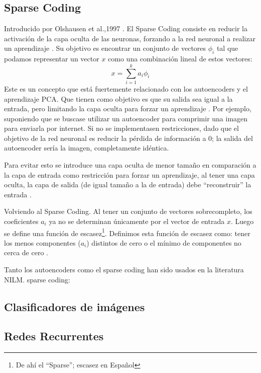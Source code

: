 \subsection{Sparse Coding}
Introducido por Olshausen et al.,1997 \autocite{OLSHAUSEN}. El Sparse Coding consiste en reducir la activación de la capa oculta de las neuronas, forzando a la red neuronal a realizar un aprendizaje \autocite{stanfordSparse}.
Su objetivo es encontrar un conjunto de vectores $\phi_i$ tal que podamos representar un vector $x$ como una combinación lineal de estos vectores: 
$$
x = \sum_{i=1}^{k}a_i\phi_i
$$
Este es un concepto que está fuertemente relacionado con los autoencoders y el aprendizaje PCA. Que tienen como objetivo es que su salida sea igual a la entrada, pero limitando la capa oculta para forzar un aprendizaje \autocite{stanfordAutoEncoding}.
Por ejemplo, suponiendo que se buscase utilizar un autoencoder para comprimir una imagen para enviarla por internet. Si no se implementasen restricciones, dado que el objetivo de la red neuronal es reducir la pérdida de información a 0; la salida del autoencoder sería la imagen, completamente idéntica.

Para evitar esto se introduce una capa oculta de menor tamaño en comparación a la capa de entrada como restricción para forzar un aprendizaje, al tener una capa oculta, la capa de salida (de igual tamaño a la de entrada) debe \enquote{reconstruir} la entrada \autocite{stanfordAutoEncoding} .

Volviendo al Sparse Coding. Al tener un conjunto de vectores sobrecompleto, los coeficientes $a_i$ ya no se determinan únicamente por el vector de entrada $x$. Luego se define una función de escasez\footnote{De ahí el \enquote{Sparse}; escasez en Español}. Definimos esta función de escasez como: tener los menos componentes ($a_i$) distintos de cero o el mínimo de componentes no cerca de cero \autocite{stanfordSparse}.

Tanto los autoencoders como el sparse coding han sido usados en la literatura NILM.
sparse coding:\autocite{SparseCodingNILM}

\subsection{Clasificadores de imágenes}

\subsection{Redes Recurrentes}
\autocite{NilmTrends}


